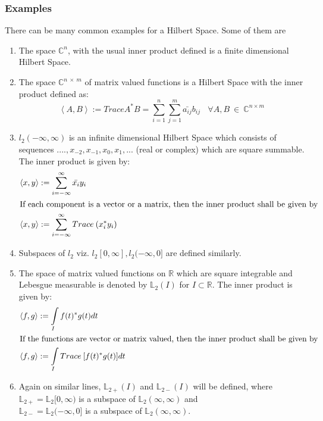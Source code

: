 \documentclass[a4paper,12pt]{article}
\begin{document}
		\subsubsection{Examples} There can be many common examples for a Hilbert Space. Some of them are
			\begin{enumerate}
				\item The space $\mathbb{C}^{n}$, with the usual inner product defined is a finite dimensional Hilbert Space.
				\item The space $\mathbb{C}^{n\:\times\:m}$ of matrix valued functions is a Hilbert Space with the inner product defined as:
					\begin{equation}
						\left\langle A, B \right\rangle := Trace A^{*}B = \sum\limits_{i=1}^n \sum\limits_{j=1}^m \bar{a_{ij}}b_{ij} \:\:\:\: \forall A,B \:\in \:\mathbb{C}^{n \times m}
					\end{equation}
				\item $l_{2}(-\infty,\infty)$ is an infinite dimensional Hilbert Space which consists of sequences ${....,x_{-2},x_{-1},x_{0},x_{1},...}$ (real or complex) which are square summable. The inner product is given by:
					\begin{align*}
						\left\langle x, y \right\rangle &:= \sum\limits_{i=-\infty}^\infty \bar{x_{i}}y_{i}\\
						\intertext{If each component is a vector or a matrix, then the inner product shall be given by}
						\left\langle x, y \right\rangle &:= \sum\limits_{i=-\infty}^\infty Trace \: (x_{i}^{*}y_{i})\\						
					\end{align*}
				\item Subspaces of $l_{2}$ viz. $l_{2}[0,\infty],l_{2}(-\infty,0]$ are defined similarly.
				\item The space of matrix valued functions on $\mathbb{R}$ which are square integrable and Lebesgue measurable is denoted by $\mathbb{L}_{2}(I)$ for $I \subset \mathbb{R}$. The inner product is given by:
				\begin{align*}
						\left\langle f, g \right\rangle &:= \int\limits_{I}f(t)^*g(t)dt\\
						\intertext{If the functions are vector or matrix valued, then the inner product shall be given by}
						\left\langle f, g \right\rangle &:= \int\limits_{I} Trace \: [f(t)^{*}g(t)]dt\\						
					\end{align*}
				\item Again on similar lines, $\mathbb{L}_{2+}(I)$ and $\mathbb{L}_{2-}(I)$ will be defined, where\\ $\mathbb{L}_{2+} = \mathbb{L}_{2}[0,\infty)$ is a subspace of $\mathbb{L}_{2}(\infty,\infty)$ and \\
		$\mathbb{L}_{2-} = \mathbb{L}_{2}(-\infty,0]$ is a subspace of $\mathbb{L}_{2}(\infty,\infty)$.
		
			\end{enumerate}
\end{document}
